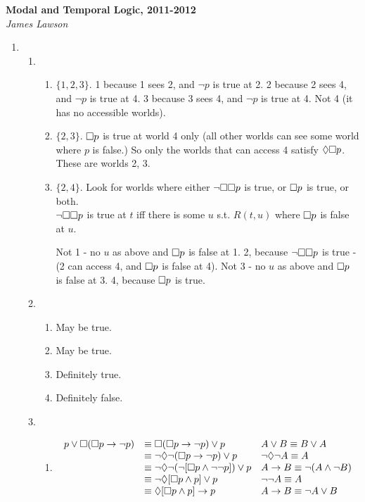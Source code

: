 \documentclass[a4paper, draft, 12pt]{article}
\begin{document}
\textbf{Modal and Temporal Logic, 2011-2012}\\
\textit{James Lawson}

\begin{enumerate} 
\item %
\begin{enumerate}
\item %
  \begin{enumerate}
  \item %
  $\{1, 2, 3\}$.
  1 because 1 sees 2, and $\neg p$ is true at 2.
  2 because 2 sees 4, and $\neg p$ is true at 4.
  3 because 3 sees 4, and $\neg p$ is true at 4.
  Not 4 (it has no accessible worlds).
  \item %
  $\{ 2, 3 \}$.
  $\square p$ is true at world 4 only (all other worlds can see some world where $p$ is false.) 
  So only the worlds that can access 4 satisfy $\Diamond \square p$. These are worlds 2, 3. 
  \item %
  $\{2, 4\}$.
  Look for worlds where either $\neg \square \square p$ is true, or $\square p$ is true, or both.\\
  $\neg \square \square p$ is true at $t$ iff there is some $u$ s.t. $R(t,u)$ where 
  $\square p$ is false at $u$. 

  Not 1 - no $u$ as above and $\square p$ is false at 1.
  2, because $\neg \square \square p$ is true - (2 can access 4, and $\square p$ is false at 4).
  Not 3 - no $u$ as above and $\square p$ is false at 3.
  4, because $\square p$ is true.
  \end{enumerate}
\item 
  \begin{enumerate}
  \item May be true.
  \item May be true.
  \item Definitely true.
  \item Definitely false.
  \end{enumerate}
\item 
  \begin{enumerate}
  \item
  $$ 
  \begin{array}{lll}
    p \vee \square (\square p \rightarrow \neg p) &\equiv \square (\square p \rightarrow \neg p) \vee p  & A \vee B \equiv B \vee A  \\
          &\equiv \neg \Diamond \neg (\square p \rightarrow \neg p) \vee p & \neg \Diamond \neg A \equiv A \\
          &\equiv \neg \Diamond \neg (\neg [\square p \wedge \neg\neg p]) \vee p & A \rightarrow B \equiv \neg(A \wedge \neg B) \\
          & \equiv \neg \Diamond [\square p \wedge p] \vee p & \neg\neg A \equiv A \\
          &\equiv \Diamond [\square p \wedge p] \rightarrow p & A \rightarrow B \equiv \neg A \vee B \\
  \end{array}
  $$


\end{enumerate}
\end{enumerate}
\end{enumerate}
\end{document}
